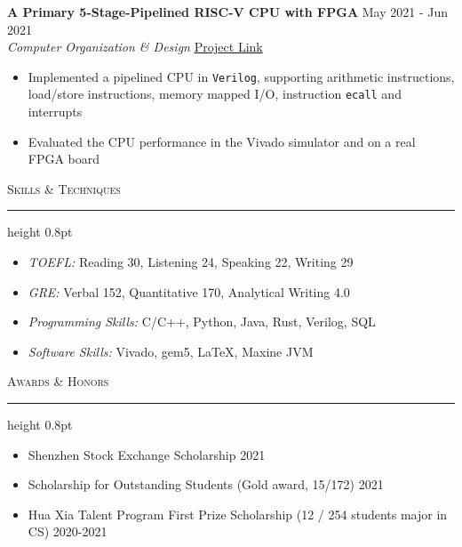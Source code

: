 \documentclass[11pt,letterpaper]{article}
\newcommand{\myline}{\par
  \kern3pt %
  \hrule height 0.8pt
  \kern5pt %
}
\newenvironment{ssubtitle}{\fontfamily{ptm}\selectfont}{}
\newcommand{\subtitle}[1]{\Large{\textsc{#1}}}
\begin{document}
\noindent
\textbf{A Primary 5-Stage-Pipelined RISC-V CPU with FPGA} \hfill May 2021 - Jun 2021 \\
\textit{Computer Organization \& Design} \hfill {\href{https://github.com/ryanyuan-yyr/COD-Labs}{Project Link}}
\begin{itemize}[noitemsep, topsep=0pt, leftmargin=11pt]
        \item Implemented a pipelined CPU in \texttt{Verilog}, supporting arithmetic instructions, load/store instructions, memory mapped I/O, instruction \texttt{ecall} and interrupts
        \item Evaluated the CPU performance in the Vivado simulator and on a real FPGA board
\end{itemize}

\vspace{8pt} \noindent
\begin{ssubtitle}\subtitle{Skills \& Techniques}\end{ssubtitle}
\myline
\begin{itemize}[noitemsep, topsep=0pt, leftmargin=11pt]
    \item \textit{TOEFL:} Reading 30, Listening 24, Speaking 22, Writing 29
    \item \textit{GRE:} Verbal 152, Quantitative 170, Analytical Writing 4.0
    \item \textit{Programming Skills:} C/C++, Python, Java, Rust, Verilog, SQL
    \item \textit{Software Skills:} Vivado, gem5, \LaTeX, Maxine JVM
\end{itemize}

\vspace{8pt} \noindent
\begin{ssubtitle}\subtitle{Awards \& Honors}\end{ssubtitle}
\myline
\begin{itemize}[noitemsep, topsep=0pt, leftmargin=11pt]
    \item Shenzhen Stock Exchange Scholarship \hfill 2021
    \item Scholarship for Outstanding Students (Gold award, 15/172) \hfill 2021
    \item Hua Xia Talent Program First Prize Scholarship (12 / 254 students major in CS) \hfill 2020-2021
\end{itemize}
\end{document}
